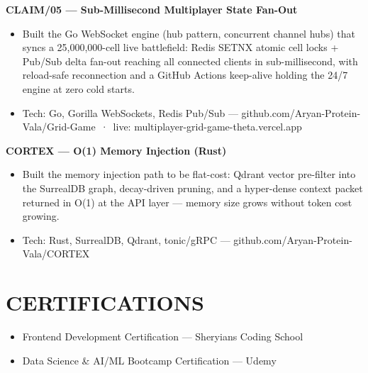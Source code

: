 \documentclass[9pt]{article}
\begin{document}
\textbf{CLAIM/05  ---  Sub-Millisecond Multiplayer State Fan-Out}
\vspace{1pt}
\begin{itemize}[leftmargin=11pt,itemsep=0pt,topsep=1pt,parsep=0pt]
\item Built the Go WebSocket engine (hub pattern, concurrent channel hubs) that syncs a 25,000,000-cell live battlefield: Redis SETNX atomic cell locks + Pub/Sub delta fan-out reaching all connected clients in sub-millisecond, with reload-safe reconnection and a GitHub Actions keep-alive holding the 24/7 engine at zero cold starts.
\item Tech: Go, Gorilla WebSockets, Redis Pub/Sub  ---  github.com/Aryan-Protein-Vala/Grid-Game \,·\, live: multiplayer-grid-game-theta.vercel.app
\end{itemize}
\textbf{CORTEX  ---  O(1) Memory Injection (Rust)}
\vspace{1pt}
\begin{itemize}[leftmargin=11pt,itemsep=0pt,topsep=1pt,parsep=0pt]
\item Built the memory injection path to be flat-cost: Qdrant vector pre-filter into the SurrealDB graph, decay-driven pruning, and a hyper-dense context packet returned in O(1) at the API layer  ---  memory size grows without token cost growing.
\item Tech: Rust, SurrealDB, Qdrant, tonic/gRPC  ---  github.com/Aryan-Protein-Vala/CORTEX
\end{itemize}
\section*{CERTIFICATIONS}
\begin{itemize}[leftmargin=11pt,itemsep=0pt,topsep=1pt,parsep=0pt]
\item Frontend Development Certification  ---  Sheryians Coding School
\item Data Science \& AI/ML Bootcamp Certification  ---  Udemy
\end{itemize}
\end{document}
